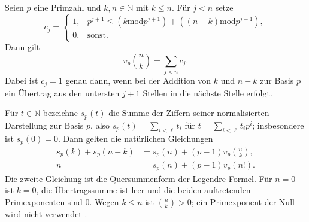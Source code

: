 \begin{theorem}
\label{b10guide:thm:kummer}
Seien $p$ eine Primzahl und $k,n\in\mathbb N$ mit $k\le n$.
Für $j<n$ setze
\[
 c_j=\begin{cases}
 1,&p^{j+1}\le
    (k\mathbin{\mathrm{mod}}p^{j+1})
    +((n-k)\mathbin{\mathrm{mod}}p^{j+1}),\\
 0,&\text{sonst}.
 \end{cases}
\]
Dann gilt
\[
 v_p\!\binom{n}{k}=\sum_{j<n}c_j.
\]
Dabei ist $c_j=1$ genau dann, wenn bei der Addition von $k$ und
$n-k$ zur Basis $p$ ein Übertrag aus den untersten $j+1$ Stellen
in die nächste Stelle erfolgt.

Für $t\in\mathbb N$ bezeichne $s_p(t)$ die Summe der Ziffern
seiner normalisierten Darstellung zur Basis $p$, also
$s_p(t)=\sum_{i<\ell}t_i$ für $t=\sum_{i<\ell}t_i p^i$;
insbesondere ist $s_p(0)=0$. Dann gelten die natürlichen Gleichungen
\[
 \begin{aligned}
 s_p(k)+s_p(n-k)
    &=s_p(n)+(p-1)v_p\!\binom{n}{k},\\
 n&=s_p(n)+(p-1)v_p(n!).
 \end{aligned}
\]
Die zweite Gleichung ist die Quersummenform der Legendre-Formel.
Für $n=0$ ist $k=0$, die Übertragssumme ist leer und die beiden
auftretenden Primexponenten sind $0$. Wegen $k\le n$ ist $\binom{n}{k}>0$;
ein Primexponent der Null wird nicht verwendet \cite{natlegendre}.
\end{theorem}
